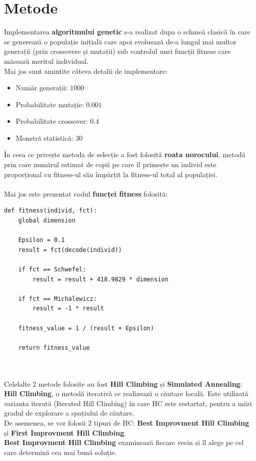 \documentclass{article}
\begin{document}
\section{Metode}
Implementarea \textbf{algoritmului genetic} s-a realizat dupa o schmeă clasică în care se generează o populație inițială care apoi evoluează de-a lungul mai multor generații (prin crossovere și mutații) sub controlul unei funcții fitness care măsoară meritul individual.\\
Mai jos sunt amintite câteva detalii de implementare:
\begin{itemize}
\item Număr generații: $1000$
\item Probabilitate mutație: $0.001$
\item Probabilitate crossover: $0.4$
\item Monstră statistică: $30$
\end{itemize}
În ceea ce privește metoda de selecție a fost folosită \textbf{roata norocului}, metodă prin care numărul estimat de copii pe care îl primește un individ este proporțional cu fitness-ul său împărțit la fitness-ul total al populației.\\ \\
Mai jos este prezentat codul \textbf{funcței fitness} folosită: 
\begin{verbatim}
def fitness(individ, fct):
    global dimension

    Epsilon = 0.1
    result = fct(decode(individ))

    if fct == Schwefel:
        result = result + 418.9829 * dimension

    if fct == Michalewicz:
        result = -1 * result

    fitness_value = 1 / (result + Epsilon)

    return fitness_value
    
    
\end{verbatim}
Celelalte 2 metode folosite au fost \textbf{Hill Climbing} și \textbf{Simulated Annealing}:\\
\textbf{Hill Climbing}, o metodă iterativă ce realizează o căutare locală. Este utilizată varianta iterată (Iterated Hill Climbing) în care HC este restartat, pentru a mări gradul de explorare a spațiului de căutare.\\
De asemenea, se vor folosii 2 tipuri de HC:  \textbf{Best Improvment Hill Climbing} și \textbf{First Improvment Hill Climbing}.\\
\textbf{Best Improvment Hill Climbing} examinează fiecare vecin și îl alege pe cel care determină cea mai bună soluție.\\
\end{document}

